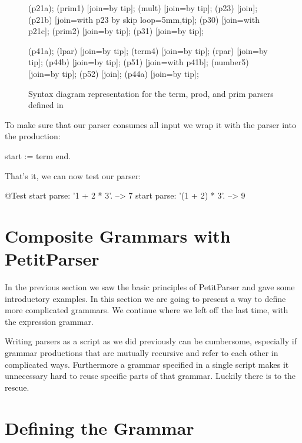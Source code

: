 \documentclass[a4paper,10pt,twoside]{book}
\begin{document}
\begin{figure}
{{    \chainin (p21a);
    \chainin (prim1) [join=by tip];
    \chainin (mult) [join=by tip];
    \chainin (p23)    [join];
    \chainin (p21b)    [join=with p23 by {skip loop=5mm,tip}];
    \chainin (p30)    [join=with p21c];
    \chainin (prim2)    [join=by tip];
    \chainin (p31)    [join=by tip];

    \chainin (p41a);
    \chainin (lpar) [join=by tip];
    \chainin (term4) [join=by tip];
    \chainin (rpar) [join=by tip];
    \chainin (p44b)    [join=by tip];
    \chainin (p51) [join=with p41b];
    \chainin (number5) [join=by tip];
    \chainin (p52) [join];
    \chainin (p44a) [join=by tip];
  }
}
  \caption{Syntax diagram representation for the term, prod, and prim parsers defined in }
  \label{fig:syntax-arithmetic}
\end{figure}

To make sure that our parser consumes all input we wrap it with the
 parser into the  production:

\begin{code}{}
start := term end.
\end{code}

That's it, we can now test our parser:

\begin{code}{@Test}
start parse: '1 + 2 * 3'.       --> 7
start parse: '(1 + 2) * 3'.     --> 9
\end{code}

\section{Composite Grammars with PetitParser}

In the previous section we saw the basic principles of PetitParser and
gave some introductory examples. In this section we are going to
present a way to define more complicated grammars. We continue where
we left off the last time, with the expression grammar.

Writing parsers as a script as we did previously can be cumbersome,
especially if grammar productions that are mutually recursive and
refer to each other in complicated ways. Furthermore a grammar
specified in a single script makes it unnecessary hard to reuse
specific parts of that grammar. Luckily there is
 to the rescue.

\section{Defining the Grammar}
\end{document}
